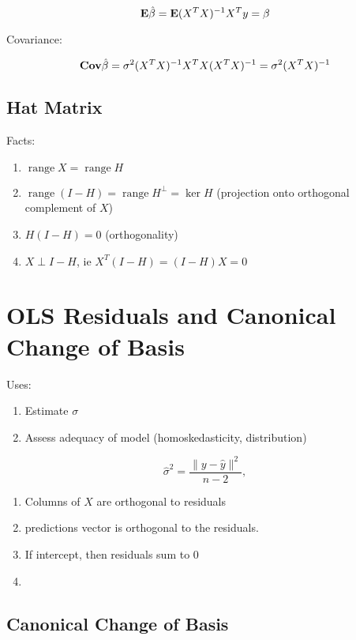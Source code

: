 \documentclass{article}
\newcommand{\range}{\operatorname{range}}
\begin{document}
$$\mathbf{E} \hat \beta = \mathbf{E} (X^TX)^{-1} X^T y = \beta$$

Covariance:

$$\mathbf{Cov} \hat \beta = \sigma^2 (X^T X)^{-1} X^T X (X^TX)^{-1} = \sigma^2 (X^TX)^{-1} $$



\subsection{Hat Matrix}
Facts:
\begin{enumerate}
	\item $\range X = \range H$
	\item $\range (I-H) = \range H^\perp = \ker H$ (projection onto orthogonal complement of $X$)
	\item $H(I- H) = 0$ (orthogonality)
	\item $X \perp I - H$, ie $X^T (I - H) =(I-H)X = 0$
\end{enumerate}



\section{OLS Residuals and Canonical Change of Basis}
Uses:
\begin{enumerate}
    \item Estimate $\sigma$
    \item Assess adequacy of model (homoskedasticity, distribution)
\end{enumerate}
$$\hat \sigma^2 = \frac{\|y-\hat y\|^2}{n-2},$$
\begin{enumerate}
	\item Columns of $X$ are orthogonal to residuals
	\item  predictions vector is orthogonal to the residuals. 
	\item If intercept, then residuals sum to $0$
	\item 
\end{enumerate}
\subsection{Canonical Change of Basis}
\end{document}
